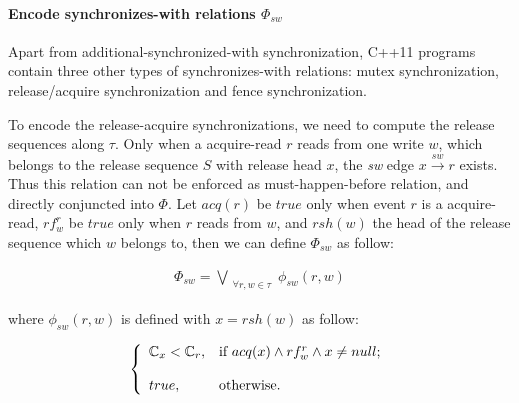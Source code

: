 \documentclass[preprint, numbers, 10pt]{sigplanconf}
\begin{document}
\paragraph{Encode synchronizes-with relations $\Phi_{sw}$}

Apart from additional-synchronized-with synchronization, C++11 programs 
contain three other types of synchronizes-with relations: 
mutex synchronization, release/acquire synchronization and fence synchronization. 

To encode the release-acquire synchronizations, we need to compute the release sequences
along $\tau$. %
Only when a acquire-read $r$ reads from one write $w$,
which belongs to the release sequence $S$ with release head $x$, the \textit{sw} edge 
$x \stackrel{sw}{\longrightarrow} r$ exists. Thus this relation can not be enforced 
as must-happen-before relation, and directly conjuncted into $\Phi$. 
Let $acq(r)$ be $true$ only when event $r$ is a acquire-read,
$rf^r_w$ be $true$ only when $r$ reads from $w$, and
$rsh(w)$ the head of the release sequence which $w$ belongs to, then 
we can define $\Phi_{sw}$ as follow: 


\begin{equation}
\begin{aligned}
\Phi_{sw} =\bigvee_{\substack{\forall r,w\in \tau}}\phi_{sw}(r,w)
\end{aligned}
\end{equation}

where $\phi_{sw}(r,w)$ is defined with $x=rsh(w)$ as follow: 

\[ \left\{
  \begin{array}{l l}
    \mathbb{C}_{x}<\mathbb{C}_r,           &  {\text{if $acq(x)\wedge rf^r_w\wedge x\neq null$}};\\\\
    true,  &  \text{otherwise}.
  \end{array} \right.\]

\end{document}
